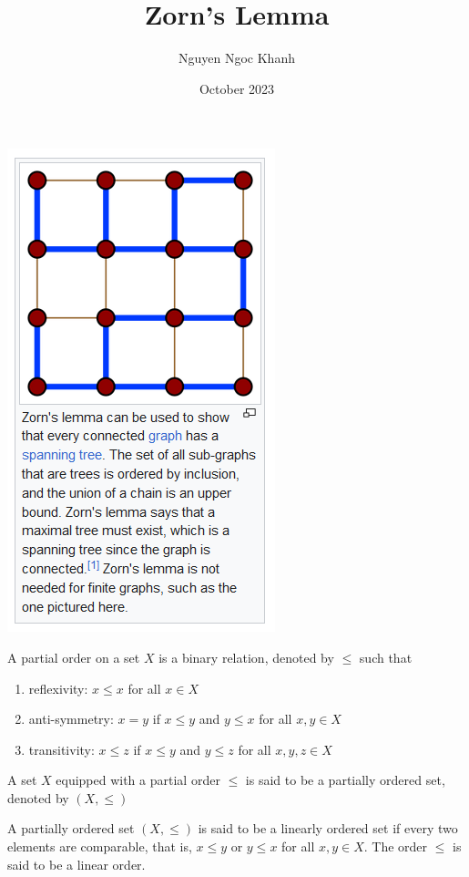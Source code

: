\documentclass{article}
\title{Zorn's Lemma}
\author{Nguyen Ngoc Khanh}
\date{October 2023}
\begin{document}
\maketitle



\includegraphics{spanning_tree.png}


\begin{definition}
    A partial order on a set $X$ is a binary relation, denoted by $\leq$ such that
    \begin{enumerate}
        \item reflexivity: $x \leq x$ for all $x \in X$
        \item anti-symmetry: $x = y$ if $x \leq y$ and $y \leq x$ for all $x, y \in X$
        \item transitivity: $x \leq z$ if $x \leq y$ and $y \leq z$ for all $x, y, z \in X$
    \end{enumerate}
    A set $X$ equipped with a partial order $\leq$ is said to be a partially ordered set, denoted by $(X, \leq)$
\end{definition}

\begin{definition}
    A partially ordered set $(X, \leq)$ is said to be a linearly ordered set if every two elements are comparable, that is, $x \leq y$ or $y \leq x$ for all $x, y \in X$. The order $\leq$ is said to be a linear order.
\end{definition}
\end{document}

